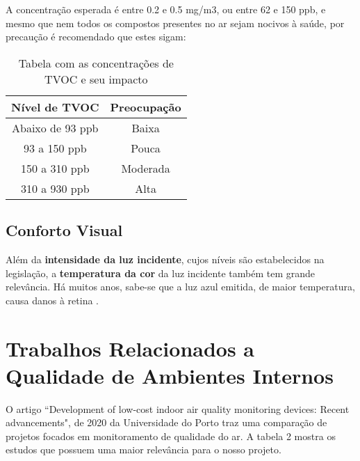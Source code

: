 \documentclass[../monografia.tex]{subfiles}
\begin{document}
A concentração esperada é entre 0.2 e 0.5 mg/m3, ou entre 62 e 150 ppb, e mesmo que nem todos os compostos presentes no ar sejam nocivos à saúde, por precaução é recomendado que estes sigam: \cite{tecam}

\begin{table}[h]
\centering
\begin{tabular}{ |c|c| }
\hline
Nível de TVOC	&   Preocupação \\
\hline
Abaixo de 93 ppb  &  Baixa \\
93 a 150 ppb  &   Pouca \\
150 a 310 ppb &  Moderada \\
310 a 930 ppb &  Alta \\
\hline
\end{tabular}
\caption{Tabela com as concentrações de TVOC e seu impacto }
\label{table}
\end{table}

\subsection{Conforto Visual}

Além da \textbf{intensidade da luz incidente}, cujos níveis são estabelecidos na legislação, a \textbf{temperatura da cor} da luz incidente também tem grande relevância. Há muitos anos, sabe-se que a luz azul emitida, de maior temperatura, causa danos à retina \cite{BlueLight}. \par


\section{Trabalhos Relacionados a Qualidade de Ambientes Internos} 

O artigo ``Development of low-cost indoor air quality monitoring devices:
Recent advancements", de 2020 da Universidade do Porto \cite{IAQ_Compare} traz uma comparação de projetos focados em monitoramento de qualidade do ar. A tabela 2 mostra os estudos que possuem uma maior relevância para o nosso projeto. 
\end{document}
